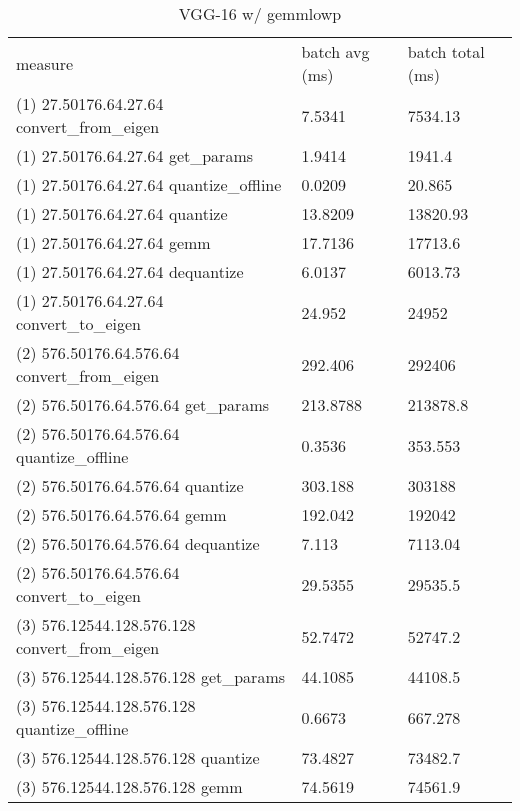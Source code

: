 \begin{longtable}{lll}
\caption{VGG-16 w/ gemmlowp}\\
measure                                          & batch avg (ms) & batch total (ms) \\
(1) 27.50176.64.27.64 convert\_from\_eigen       & 7.5341         & 7534.13          \\
(1) 27.50176.64.27.64 get\_params                & 1.9414         & 1941.4           \\
(1) 27.50176.64.27.64 quantize\_offline          & 0.0209         & 20.865           \\
(1) 27.50176.64.27.64 quantize                   & 13.8209        & 13820.93         \\
(1) 27.50176.64.27.64 gemm                       & 17.7136        & 17713.6          \\
(1) 27.50176.64.27.64 dequantize                 & 6.0137         & 6013.73          \\
(1) 27.50176.64.27.64 convert\_to\_eigen         & 24.952         & 24952            \\
(2) 576.50176.64.576.64 convert\_from\_eigen     & 292.406        & 292406           \\
(2) 576.50176.64.576.64 get\_params              & 213.8788       & 213878.8         \\
(2) 576.50176.64.576.64 quantize\_offline        & 0.3536         & 353.553          \\
(2) 576.50176.64.576.64 quantize                 & 303.188        & 303188           \\
(2) 576.50176.64.576.64 gemm                     & 192.042        & 192042           \\
(2) 576.50176.64.576.64 dequantize               & 7.113          & 7113.04          \\
(2) 576.50176.64.576.64 convert\_to\_eigen       & 29.5355        & 29535.5          \\
(3) 576.12544.128.576.128 convert\_from\_eigen   & 52.7472        & 52747.2          \\
(3) 576.12544.128.576.128 get\_params            & 44.1085        & 44108.5          \\
(3) 576.12544.128.576.128 quantize\_offline      & 0.6673         & 667.278          \\
(3) 576.12544.128.576.128 quantize               & 73.4827        & 73482.7          \\
(3) 576.12544.128.576.128 gemm                   & 74.5619        & 74561.9          \\

\end{longtable}
